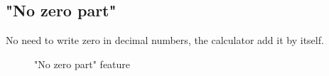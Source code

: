 \documentclass[a5paper, 11pt]{article}
\begin{document}
    \subsection{"No zero part"}
        No need to write zero in decimal numbers, the calculator add it by itself.
        \begin{figure}[h]
            \centering
            \caption{"No zero part" feature}
            \label{pic:"no_zero_part"}
        \end{figure}
\end{document}
